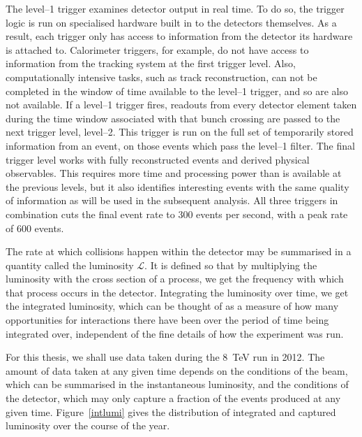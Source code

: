 The level--1 trigger examines detector output in real time. To do so, the trigger logic is run on specialised hardware built in to the detectors themselves. As a result, each trigger only has access to information from the detector its hardware is attached to. Calorimeter triggers, for example, do not have access to information from the tracking system at the first trigger level. Also, computationally intensive tasks, such as track reconstruction, can not be completed in the window of time available to the level--1 trigger, and so are also not available. If a level--1 trigger fires, readouts from every detector element taken during the time window associated with that bunch crossing are passed to the next trigger level, level--2. This trigger is run on the full set of temporarily stored information from an event, on those events which pass the level--1 filter. The final trigger level works with fully reconstructed events and derived physical observables. This requires more time and processing power than is available at the previous levels, but it also identifies interesting events with the same quality of information as will be used in the subsequent analysis. All three triggers in combination cuts the final event rate to 300 events per second, with a peak rate of 600 events.

The rate at which collisions happen within the detector may be summarised in a quantity called the luminosity $\mathscr L$. It is defined so that by multiplying the luminosity with the cross section of a process, we get the frequency with which that process occurs in the detector. Integrating the luminosity over time, we get the integrated luminosity, which can be thought of as a measure of how many opportunities for interactions there have been over the period of time being integrated over, independent of the fine details of how the experiment was run.

For this thesis, we shall use data taken during the 8~TeV run in 2012. The amount of data taken at any given time depends on the conditions of the beam, which can be summarised in the instantaneous luminosity, and the conditions of the detector, which may only capture a fraction of the events produced at any given time. Figure~\ref{intlumi} gives the distribution of integrated and captured luminosity over the course of the year.

